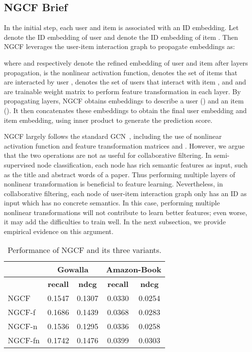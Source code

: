 \documentclass[sigconf]{acmart}
\theoremstyle{definition}
\begin{document}
\subsection{NGCF Brief}\label{ss:ngcf}
In the initial step, each user and item is associated with an ID embedding. Let  denote the ID embedding of user  and  denote the ID embedding of item . Then NGCF leverages the user-item interaction graph to propagate embeddings as:

where  and  respectively denote the refined embedding of user  and item  after  layers propagation,  is the nonlinear activation function,
 denotes the set of items that are interacted by user ,  denotes the set of users that interact with item , and  and  are trainable weight matrix to perform feature transformation in each layer. 
By propagating  layers, NGCF obtains
 embeddings to describe a user () and an item (). It then concatenates these  embeddings to obtain the final user embedding and item embedding, using inner product to generate the prediction score. 


NGCF largely follows the standard GCN~\cite{GCN}, including the use of nonlinear activation function  and feature transformation matrices  and . However, we argue that the two operations are not as useful for collaborative filtering. In  semi-supervised node classification, each node has rich semantic features as input, such as the title and abstract words of a paper. Thus performing multiple layers of nonlinear transformation is beneficial to feature learning. Nevertheless, in collaborative filtering, each node of user-item interaction graph only has an ID as input which has no concrete semantics. In this case, performing multiple nonlinear transformations will not contribute to learn better features; even worse, it may add the difficulties to train well. In the next subsection, we provide empirical evidence on this argument. 

\begin{table}[t]
\caption{Performance of NGCF and its three variants.}
\vspace{-10px}
\label{tab:pre}
\begin{tabular}{l|c c|c c}
\hline
 & \multicolumn{2}{c|}{\textbf{Gowalla}} & \multicolumn{2}{c}{\textbf{Amazon-Book}} \\ \hline
 & \textbf{recall} & \textbf{ndcg} &  \textbf{recall} & \textbf{ndcg} \\ \hline\hline
NGCF &  0.1547 & 0.1307 & 0.0330 & 0.0254 \\ \hline 
NGCF-f    & 0.1686 & 0.1439 & 0.0368 & 0.0283 \\ 
NGCF-n & 0.1536 & 0.1295 & 0.0336 & 0.0258 \\  
NGCF-fn   & 0.1742 & 0.1476 & 0.0399 & 0.0303 \\ \hline
\end{tabular}\end{table}
\end{document}
